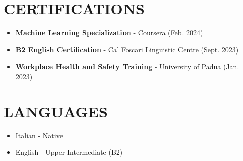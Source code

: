 \documentclass[a4paper,10pt]{article}
\begin{document}
\section*{CERTIFICATIONS}
\begin{itemize}[leftmargin=*, label={$\bullet$}]
    \item \textbf{Machine Learning Specialization} - Coursera (Feb. 2024)
    \item \textbf{B2 English Certification} - Ca' Foscari Linguistic Centre (Sept. 2023)
    \item \textbf{Workplace Health and Safety Training} - University of Padua (Jan. 2023)
\end{itemize}

\section*{LANGUAGES}
\begin{itemize}[leftmargin=*, label={$\bullet$}]
    \item Italian - Native
    \item English - Upper-Intermediate (B2)
\end{itemize}
\end{document}
